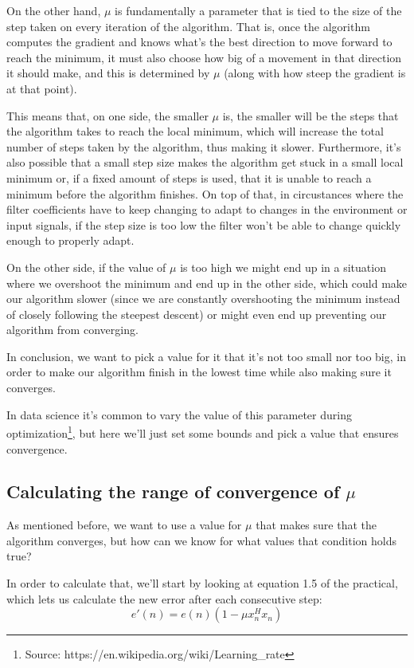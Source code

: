 \documentclass[conference,9pt]{IEEEtran}
\begin{document}
On the other hand, $\mu$ is fundamentally a parameter that is tied to the size of the step taken on every iteration of the algorithm. That is, once the algorithm computes the gradient and knows what's the best direction to move forward to reach the minimum, it must also choose how big of a movement in that direction it should make, and this is determined by $\mu$ (along with how steep the gradient is at that point).

This means that, on one side, the smaller $\mu$ is, the smaller will be the steps that the algorithm takes to reach the local minimum, which will increase the total number of steps taken by the algorithm, thus making it slower. Furthermore, it's also possible that a small step size makes the algorithm get stuck in a small local minimum or, if a fixed amount of steps is used, that it is unable to reach a minimum before the algorithm finishes. On top of that, in circustances where the filter coefficients have to keep changing to adapt to changes in the environment or input signals, if the step size is too low the filter won't be able to change quickly enough to properly adapt.

On the other side, if the value of $\mu$ is too high we might end up in a situation where we overshoot the minimum and end up in the other side, which could make our algorithm slower (since we are constantly overshooting the minimum instead of closely following the steepest descent) or might even end up preventing our algorithm from converging.

In conclusion, we want to pick a value for it that it's not too small nor too big, in order to make our algorithm finish in the lowest time while also making sure it converges.

In data science it's common to vary the value of this parameter during optimization\footnote{Source: https://en.wikipedia.org/wiki/Learning\_rate}, but here we'll just set some bounds and pick a value that ensures convergence.

\subsection{Calculating the range of convergence of $\mu$}

As mentioned before, we want to use a value for $\mu$ that makes sure that the algorithm converges, but how can we know for what values that condition holds true?

In order to calculate that, we'll start by looking at equation 1.5 of the practical, which lets us calculate the new error after each consecutive step:
$$e'(n)=e(n)(1-\mu x_n^H x_n)$$
\end{document}

